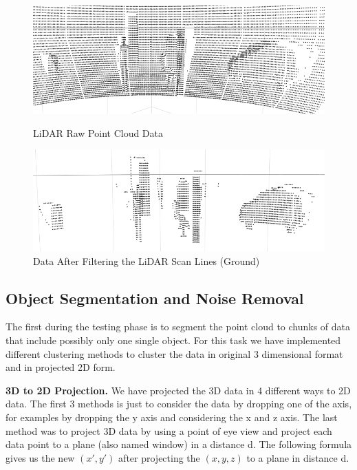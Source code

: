 \begin{figure}[!h]
\centering
\begin{minipage}{0.49\textwidth}
  \centering
        \includegraphics[width=.9\linewidth]{images/ground_before2.png}
        \caption{LiDAR Raw Point Cloud Data}
        \label{fig:ground_before}
\end{minipage}%
\begin{minipage}{0.49\textwidth}
  \centering
        \includegraphics[width=.9\linewidth]{images/ground_after2.png}
        \caption{Data After Filtering the LiDAR Scan Lines (Ground)}
        \label{fig:after}
\end{minipage}%
\end{figure}





\subsection{Object Segmentation and Noise Removal}
The first during the testing phase is to segment the point cloud to chunks of data that include possibly only one single object.
For this task we have implemented different clustering methods to cluster the data in original 3 dimensional format and in projected 2D form.      



\textbf{3D to 2D Projection.} We have projected the 3D data in 4 different ways to 2D data. The first 3 methods is just to consider the data by dropping one of the axis, for examples by dropping the y axis and considering the x and z axis.  The last method was to project 3D data by using a point of eye view and project each data point to a plane (also named window) in a distance d.  The following formula gives us the new $(x',  y')$ after projecting the $(x,y,z)$ to a plane in distance d. 

